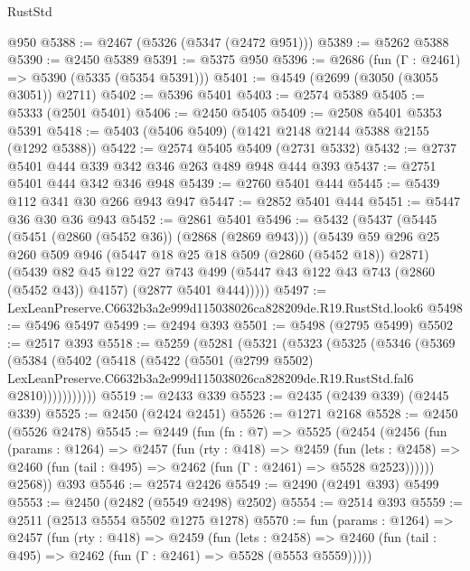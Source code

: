 \begin{lexlean}{RustStd}
\begin{coremodule}
    @950
@5388 := @2467 (@5326 (@5347 (@2472 @951)))
@5389 := @5262 @5388
@5390 := @2450 @5389
@5391 := @5375 @950
@5396 := @2686 (fun (Γ : @2461) => @5390 (@5335 (@5354 @5391)))
@5401 := @4549 (@2699 (@3050 (@3055 @3051)) @2711)
@5402 := @5396 @5401
@5403 := @2574 @5389
@5405 := @5333 (@2501 @5401)
@5406 := @2450 @5405
@5409 := @2508 @5401 @5353 @5391
@5418 := @5403 (@5406 @5409) (@1421 @2148 @2144 @5388 @2155 (@1292 @5388))
@5422 := @2574 @5405 @5409 (@2731 @5332)
@5432 := @2737 @5401 @444 @339 @342 @346 @263 @489 @948 @444 @393
@5437 := @2751 @5401 @444 @342 @346 @948
@5439 := @2760 @5401 @444
@5445 := @5439 @112 @341 @30 @266 @943 @947
@5447 := @2852 @5401 @444
@5451 := @5447 @36 @30 @36 @943
@5452 := @2861 @5401
@5496 := @5432
    (@5437
      (@5445
        (@5451 (@2860 (@5452 @36)) (@2868 (@2869 @943)))
        (@5439
          @59
          @296
          @25
          @260
          @509
          @946
          (@5447 @18 @25 @18 @509 (@2860 (@5452 @18)) @2871)
          (@5439
            @82
            @45
            @122
            @27
            @743
            @499
            (@5447 @43 @122 @43 @743 (@2860 (@5452 @43)) @4157)
            (@2877 @5401 @444)))))
@5497 := LexLeanPreserve.C6632b3a2e999d115038026ca828209de.R19.RustStd.look6
@5498 := @5496 @5497
@5499 := @2494 @393
@5501 := @5498 (@2795 @5499)
@5502 := @2517 @393
@5518 := @5259
    (@5281
      (@5321
        (@5323
          (@5325
            (@5346
              (@5369
                (@5384
                  (@5402
                    (@5418
                      (@5422
                        (@5501
                          (@2799 @5502)
                          LexLeanPreserve.C6632b3a2e999d115038026ca828209de.R19.RustStd.fal6
                          @2810)))))))))))
@5519 := @2433 @339
@5523 := @2435 (@2439 @339) (@2445 @339)
@5525 := @2450 (@2424 @2451)
@5526 := @1271 @2168
@5528 := @2450 (@5526 @2478)
@5545 := @2449
    (fun (fn : @7) =>
    @5525
      (@2454
        (@2456
          (fun (params : @1264) =>
          @2457
            (fun (rty : @418) =>
            @2459
              (fun (lets : @2458) =>
              @2460 (fun (tail : @495) => @2462 (fun (Γ : @2461) => @5528 @2523))))))
        @2568))
    @393
@5546 := @2574 @2426
@5549 := @2490 (@2491 @393) @5499
@5553 := @2450 (@2482 (@5549 @2498) @2502)
@5554 := @2514 @393
@5559 := @2511 (@2513 @5554 @5502 @1275 @1278)
@5570 := fun (params : @1264) =>
  @2457
    (fun (rty : @418) =>
    @2459
      (fun (lets : @2458) =>
      @2460 (fun (tail : @495) => @2462 (fun (Γ : @2461) => @5528 (@5553 @5559)))))

\end{coremodule}
\end{lexlean}
